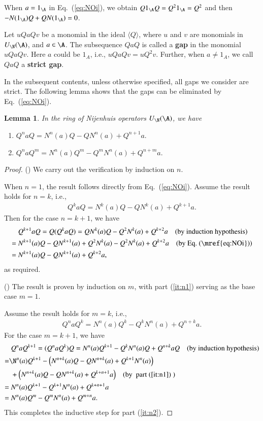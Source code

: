 \documentclass[12pt]{amsart}
\newtheorem{lemma}[theorem]{Lemma}
\theoremstyle{definition}
\begin{document}
When $a=1_\A$ in Eq.~(\ref{eq:NOi}), we obtain $Q1_\A Q= Q^21_\A= Q^2$ and then $-N(1_\A)Q+QN(1_\A)=0$.


Let $uQaQv$ be a monomial in the ideal $\langle Q \rangle$, where $u$ and $v$ are monomials in $U_\N(\A)$, and $a\in \A$. The subsequence $QaQ$ is called a {\bf gap} in the monomial $uQaQv$. Here $a$ could be $1_A$, i.e., $uQaQv=uQ^2v$. Further, when $a\neq 1_A$, we call $QaQ$ a {\bf strict gap}. %


In the subsequent contents, unless otherwise specified, all gaps we consider are strict. The following lemma shows that the gaps can be eliminated by Eq.~(\ref{eq:NOi}). 
\begin{lemma}
In the ring of Nijenhuis operators $U_{\N}(\A)$, we have
\begin{enumerate} 
\item {}
$Q^naQ=N^n(a)Q-QN^n(a)+Q^{n+1}a.$
\item {}
$Q^naQ^m=N^n(a)Q^m-Q^mN^n(a)+Q^{n+m}a.$
\end{enumerate}
\end{lemma}
%
\begin{proof}
() We carry out the verification by induction on $n$.

When $n=1$, the result follows directly from Eq.~(\ref{eq:NOi}). Assume the result holds for $n = k$, i.e., 
\begin{align*}
Q^kaQ=N^k(a)Q-QN^k(a)+Q^{k+1}a.
\end{align*}
Then for the case $n = k+1$, we have
\begin{align*}
&\ Q^{k+1}aQ=Q(Q^{k}aQ)=QN^k(a)Q-Q^2N^k(a)+Q^{k+2}a\quad \text{(by induction hypothesis)}\\
=&\ N^{k+1}(a)Q-QN^{k+1}(a)+Q^2N^k(a)-Q^2N^k(a)+Q^{k+2}a\quad \text{(by Eq.~(\mref{eq:NOi}))}\\
=&\ N^{k+1}(a)Q-QN^{k+1}(a) +Q^{k+2}a,  
\end{align*} 
as required.

() The result is proven by induction on $m$, with part (\ref{it:n1}) serving as the base case $m=1$.

Assume the result holds for $m = k$, i.e.,
\begin{align*}
Q^naQ^k=N^n(a)Q^k-Q^kN^n(a)+Q^{n+k}a.
\end{align*}
For the case $m = k+1$, we have
\begin{align*}
&\ Q^{n}aQ^{k+1}= (Q^{n}aQ^{k})Q= N^n(a)Q^{k+1}-Q^kN^n(a)Q+Q^{n+k}aQ\quad \text{(by induction hypothesis)}\\ 
=&\N^n(a)Q^{k+1}-\Big(N^{n+k}(a)Q-QN^{n+k}(a)+Q^{k+1}N^n(a)\Big)\\
&\ +\Big(N^{n+k}(a)Q-QN^{n+k}(a)+Q^{k+n+1} a \Big)\quad \text{(by ~part (\ref{it:n1})
)}\\
=&\ N^n(a)Q^{k+1}- Q^{k+1}N^n(a) +Q^{k+n+1} a\\
=&\ N^n(a)Q^{m}- Q^{m}N^n(a) +Q^{m+n } a.
\end{align*} 
This completes the inductive step for part (\ref{it:n2}).  

\end{proof} 
\end{document}
